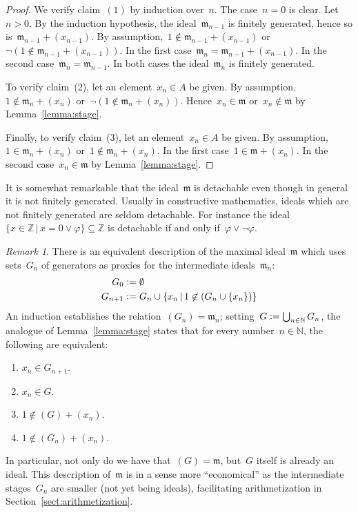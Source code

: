 \documentclass[oneside,reqno]{amsart}
\theoremstyle{definition}
\theoremstyle{plain}
\theoremstyle{remark}
\newtheorem{rem}[defn]{Remark}
\newcommand{\mmm}{\mathfrak{m}}
\newcommand{\ZZ}{\mathbb{Z}}
\newcommand{\NN}{\mathbb{N}}
\newcommand{\defeq}{\vcentcolon=}
\renewcommand{\_}{\mathpunct{.}\,}
\begin{document}
\begin{proof}We verify claim~$(1)$ by induction over~$n$. The case~$n = 0$ is
clear. Let~$n > 0$. By the induction hypothesis, the ideal~$\mmm_{n-1}$ is finitely
generated, hence so is~$\mmm_{n-1} + (x_{n-1})$. By assumption,~$1 \not\in \mmm_{n-1} +
(x_{n-1})$ or~$\neg(1 \not\in \mmm_{n-1} + (x_{n-1}))$. In the first
case~$\mmm_n = \mmm_{n-1} + (x_{n-1})$. In the second case~$\mmm_n =
\mmm_{n-1}$. In both cases
the ideal~$\mmm_n$ is finitely generated.

To verify claim~(2), let an element~$x_n \in A$ be given. By assumption,~$1
\not\in \mmm_n + (x_n)$ or~$\neg(1 \not\in \mmm_n + (x_n))$. Hence~$x_n \in
\mmm$ or~$x_n \not\in \mmm$ by Lemma~\ref{lemma:stage}.

Finally, to verify claim~(3), let an element~$x_n \in A$ be given. By
assumption,~$1 \in \mmm_n + (x_n)$ or~$1 \not\in \mmm_n + (x_n)$. In the first
case~$1 \in \mmm + (x_n)$. In the second
case~$x_n \in \mmm$ by Lemma~\ref{lemma:stage}.
\end{proof}

It is somewhat remarkable that the ideal~$\mmm$ is detachable even though in
general it is not finitely generated. Usually in constructive mathematics, ideals which are not
finitely generated are seldom detachable. For instance the ideal~$\{ x \in
\ZZ \,|\, x = 0 \vee \varphi \} \subseteq \ZZ$ is detachable if and only
if~$\varphi \vee \neg\varphi$.

\begin{rem}\label{rem:via-generators}There is an equivalent description of the
maximal ideal~$\mmm$ which uses sets~$G_n$ of generators as proxies for the
intermediate ideals~$\mmm_n$:
\begin{align*}
  G_0 &\defeq \emptyset \\
  G_{n+1} &\defeq G_n \cup \{ x_n \,|\, 1 \not\in (G_n \cup \{ x_n \}) \}
\end{align*}
An induction establishes the relation~$(G_n) = \mmm_n$; setting~$G \defeq
\bigcup_{n\in\NN} G_n$, the analogue of Lemma~\ref{lemma:stage} states
that for every number~$n \in \NN$, the following are equivalent:
\begin{enumerate}
\item $x_n \in G_{n+1}$.
\item $x_n \in G$.
\item $1 \not\in (G) + (x_n)$.
\item $1 \not\in (G_n) + (x_n)$.
\end{enumerate}
In particular, not only do we have that~$(G) = \mmm$, but~$G$ itself is already
an ideal. This description of~$\mmm$ is in a sense more ``economical'' as the
intermediate stages~$G_n$ are smaller (not yet being ideals), facilitating
arithmetization in Section~\ref{sect:arithmetization}.
\end{rem}
\end{document}
